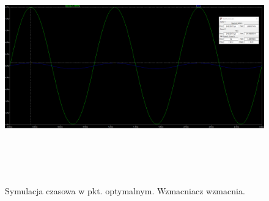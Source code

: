 \documentclass{article}
\begin{document}
\pagebreak
\begin{landscape}
	\begin{figure}[h]
		\vspace*{-2cm}
		\includegraphics[width=20cm,height=10cm]{graphics/optim_tran.png}
	\centering
	\caption{Symulacja czasowa w pkt. optymalnym. Wzmacniacz wzmacnia.}
	\end{figure}
\end{landscape}
\end{document}
